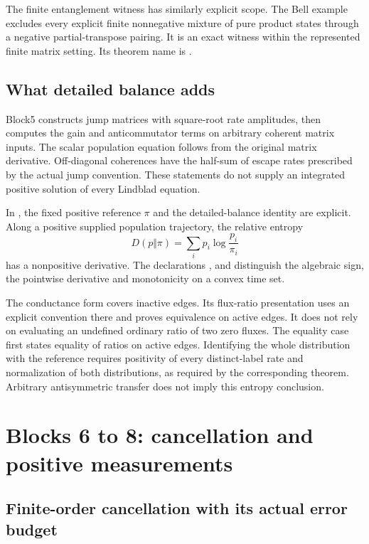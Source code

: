 The finite entanglement witness has similarly explicit scope. The Bell example excludes every explicit finite nonnegative mixture of pure product states through a negative partial-transpose pairing. It is an exact witness within the represented finite matrix setting. Its theorem name is .

\subsection{What detailed balance adds}

Block5 constructs jump matrices with square-root rate amplitudes, then computes the gain and anticommutator terms on arbitrary coherent matrix inputs. The scalar population equation follows from the original matrix derivative. Off-diagonal coherences have the half-sum of escape rates prescribed by the actual jump convention. These statements do not supply an integrated positive solution of every Lindblad equation.

In , the fixed positive reference \(\pi\) and the detailed-balance identity are explicit. Along a positive supplied population trajectory, the relative entropy
\[
 D(p\Vert\pi)=\sum_i p_i\log\frac{p_i}{\pi_i}
\]
has a nonpositive derivative. The declarations ,  and  distinguish the algebraic sign, the pointwise derivative and monotonicity on a convex time set.

The conductance form covers inactive edges. Its flux-ratio presentation uses an explicit convention there and proves equivalence on active edges. It does not rely on evaluating an undefined ordinary ratio of two zero fluxes. The equality case first states equality of ratios on active edges. Identifying the whole distribution with the reference requires positivity of every distinct-label rate and normalization of both distributions, as required by the corresponding theorem. Arbitrary antisymmetric transfer does not imply this entropy conclusion.

\section{Blocks 6 to 8: cancellation and positive measurements}

\subsection{Finite-order cancellation with its actual error budget}

